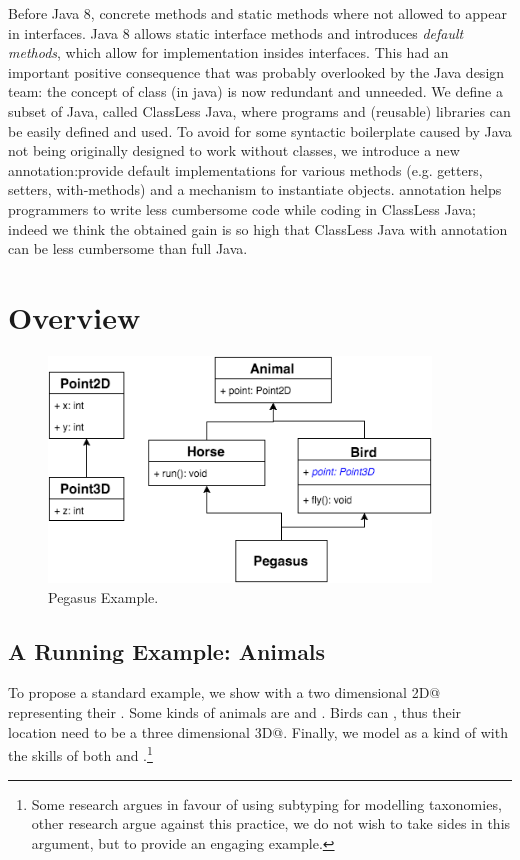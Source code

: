 
Before Java 8, concrete methods and static methods where not allowed to appear in interfaces.
Java 8 allows static interface methods and introduces
\emph{default methods}, which allow for implementation insides interfaces. This had an important positive consequence that was probably overlooked by the Java design team: the concept of class (in java) is now redundant and unneeded.
We define a subset of Java, called ClassLess Java, where programs and (reusable) libraries can be easily defined and used.
To avoid for some syntactic boilerplate caused by Java not being originally designed to work without classes, we introduce a new annotation:\mixin  provide default
implementations for various methods (e.g. getters, setters, with-methods)
and a mechanism to instantiate objects. \mixin annotation helps programmers to
write less cumbersome code while coding in ClassLess Java;
indeed we think the obtained gain is so high that ClassLess Java with \mixin annotation can be less cumbersome than full Java.


\section{Overview}\label{sec:ep}

\begin{figure}[tbp]
\centering
\includegraphics[width=4in]{PegasusDetail.png}
\caption{Pegasus Example.}\label{fig:pegasus}
\end{figure}

\subsection{A Running Example: Animals}
To propose a standard example, we show \Q@Animal@s with a two dimensional \Q@Point2D@ representing their \Q@location@.
Some kinds of animals are \Q@Horse@s and \Q@Bird@s.
Birds can \Q@fly@, thus their location need to be a three dimensional \Q@Point3D@.
Finally, we model \Q@Pegasus@ as a kind of \Q@Animal@ with the skills of both \Q@Horse@s and \Q@Bird@s.\footnote{
Some research argues in favour of using subtyping for modelling taxonomies, other research argue against this practice, we do not wish to take sides in this argument, but to provide an engaging example.}

